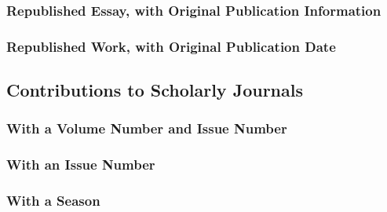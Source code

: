 \documentclass{ltxdockit}
\begin{document}
\subsubsection{Republished Essay, with Original Publication Information} %
\label{sub:republished_essay_with_original_publication_information}
\begin{refsection}
	\printbibliography[heading=none]
\end{refsection}
\subsubsection{Republished Work, with Original Publication Date} %
\label{sub:republished_work_with_original_publication_date}
\begin{refsection}
	\printbibliography[heading=none]
\end{refsection}

\subsection{Contributions to Scholarly Journals} %
\label{sec:contributions_to_scholarly_journals}
\subsubsection{With a Volume Number and Issue Number} %
\label{sub:with_a_volume_number_and_issue_number}
\begin{refsection}
	\printbibliography[heading=none]
\end{refsection}
\subsubsection{With an Issue Number} %
\label{sub:with_an_issue_number}
\begin{refsection}
	\printbibliography[heading=none]
\end{refsection}
\subsubsection{With a Season} %
\label{sub:with_a_season}
\begin{refsection}
	\printbibliography[heading=none]
\end{refsection}
\end{document}
